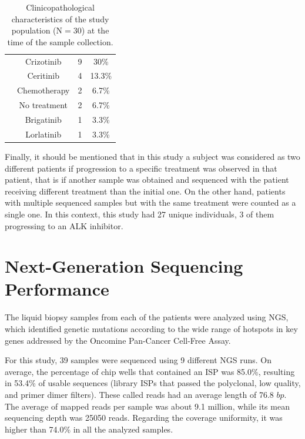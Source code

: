 \begin{table}[t]
{\begin{tabular}{cccc}
\rowcolor[HTML]{FFFFFF}
\cellcolor[HTML]{FFFFFF} & Crizotinib & 9 & 30\% \\
\rowcolor[HTML]{FFFFFF}
\cellcolor[HTML]{FFFFFF} & Ceritinib & 4 & 13.3\% \\
\rowcolor[HTML]{FFFFFF}
\cellcolor[HTML]{FFFFFF} & Chemotherapy & 2 & 6.7\% \\
\rowcolor[HTML]{FFFFFF}
\cellcolor[HTML]{FFFFFF} & No treatment & 2 & 6.7\% \\
\rowcolor[HTML]{FFFFFF}
\cellcolor[HTML]{FFFFFF} &  Brigatinib & 1 & 3.3\% \\
\rowcolor[HTML]{FFFFFF}
\multirow{-7}{*}{\cellcolor[HTML]{FFFFFF}\textbf{Treatment}} & Lorlatinib & 1 & 3.3\%
\end{tabular}}
\caption{Clinicopathological characteristics of the study population (N$=$30) at the time of the sample collection.}
\label{tab:Patients}
\end{table}

Finally, it should be mentioned that in this study a subject was considered as two different patients if progression to a specific treatment was observed in that patient, that is if another sample was obtained and sequenced with the patient receiving different treatment than the initial one. On the other hand, patients with multiple sequenced samples but with the same treatment were counted as a single one. In this context, this study had 27 unique individuals, 3 of them progressing to an ALK inhibitor.

\section{Next-Generation Sequencing Performance}

The liquid biopsy samples from each of the patients were analyzed using NGS, which identified genetic mutations according to the wide range of hotspots in key genes addressed by the Oncomine\texttrademark{} Pan-Cancer Cell-Free Assay.

For this study, 39 samples were sequenced using 9 different NGS runs. On average, the percentage of chip wells that contained an ISP was 85.0\%, resulting in 53.4\% of usable sequences (library ISPs that passed the polyclonal, low quality, and primer dimer filters). These called reads had an average length of 76.8 $bp$. The average of mapped reads per sample was about 9.1 million, while its mean sequencing depth was 25050 reads. Regarding the coverage uniformity, it was higher than 74.0\% in all the analyzed samples.


